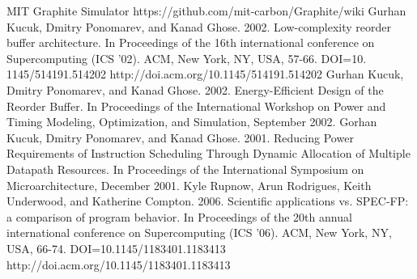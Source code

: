 \documentclass{acm_proc_article-sp}
\begin{document}
\begin{thebibliography}{------}
MIT Graphite Simulator
https://github.com/mit-carbon/Graphite/wiki
Gurhan Kucuk, Dmitry Ponomarev, and Kanad Ghose. 2002. Low-complexity reorder buffer architecture. In Proceedings
of the 16th international conference on Supercomputing (ICS '02). ACM, New York, NY, USA, 57-66. DOI=10.
1145/514191.514202 http://doi.acm.org/10.1145/514191.514202
Gurhan Kucuk, Dmitry Ponomarev, and Kanad Ghose. 2002. Energy-Efficient Design of the Reorder Buffer. In Proceedings of the International Workshop on Power and Timing Modeling, Optimization, and Simulation, September 2002.
Gorhan Kucuk, Dmitry Ponomarev, and Kanad Ghose. 2001. Reducing Power Requirements of Instruction Scheduling Through Dynamic Allocation of Multiple Datapath Resources. In Proceedings of the International Symposium on Microarchitecture, December 2001.
Kyle Rupnow, Arun Rodrigues, Keith Underwood, and Katherine Compton. 2006. Scientific applications vs. SPEC-FP: a comparison of program behavior. In Proceedings of the 20th annual international conference on Supercomputing (ICS '06). ACM, New York, NY, USA, 66-74. DOI=10.1145/1183401.1183413 http://doi.acm.org/10.1145/1183401.1183413 


\end{thebibliography}
\end{document}
